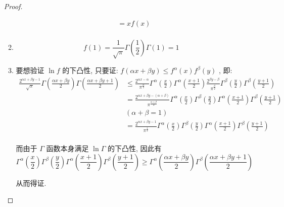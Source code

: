 \documentclass{article}
\begin{document}
\begin{enumerate}
\begin{proof}
\begin{enumerate}
\begin{equation}
\begin{aligned}
                    &=xf(x) \\
                \end{aligned}
                \nonumber
            \end{equation}
            \item \begin{equation}
                f(1)=\frac{1}{\sqrt{\pi}}\Gamma\left(\frac{1}{2}\right)\Gamma(1)=1
                \nonumber
            \end{equation}
            \item 要想验证 $\ln f$ 的下凸性, 只要证: $f(\alpha x+\beta y)\leq f^{\alpha}(x)f^{\beta}(y)$ , 即:
            \begin{equation}
                \begin{aligned}
                    \frac{2^{\alpha x+\beta y-1}}{\sqrt{\pi}}\Gamma\left(\frac{\alpha x+\beta y}{2}\right)\Gamma\left(\frac{\alpha x+\beta y+1}{2}\right)
                    &\leq\frac{2^{\alpha x-\alpha}}{\pi^{\frac{\alpha}{2}}}\Gamma^{\alpha}\left(\frac{x}{2}\right)\Gamma^{\alpha}\left(\frac{x+1}{2}\right)\frac{2^{\beta y-\beta}}{\pi^{\frac{\beta}{2}}}\Gamma^{\beta}\left(\frac{y}{2}\right)\Gamma^{\beta}\left(\frac{y+1}{2}\right) \\
                    &=\frac{2^{\alpha x+\beta y-(\alpha+\beta)}}{\pi^{\frac{\alpha+\beta}{2}}}\Gamma^{\alpha}\left(\frac{x}{2}\right)\Gamma^{\beta}\left(\frac{y}{2}\right)\Gamma^{\alpha}\left(\frac{x+1}{2}\right)\Gamma^{\beta}\left(\frac{y+1}{2}\right) \\
                    &(\alpha+\beta=1) \\
                    &=\frac{2^{\alpha x+\beta y-1}}{\pi^{\frac{1}{2}}}\Gamma^{\alpha}\left(\frac{x}{2}\right)\Gamma^{\beta}\left(\frac{y}{2}\right)\Gamma^{\alpha}\left(\frac{x+1}{2}\right)\Gamma^{\beta}\left(\frac{y+1}{2}\right) \\
                \end{aligned}
                \nonumber
            \end{equation} \par
            而由于 $\Gamma$ 函数本身满足 $\ln\Gamma$ 的下凸性, 因此有 $$\Gamma^{\alpha}\left(\frac{x}{2}\right)\Gamma^{\beta}\left(\frac{y}{2}\right)\Gamma^{\alpha}\left(\frac{x+1}{2}\right)\Gamma^{\beta}\left(\frac{y+1}{2}\right)\geq\Gamma^{\alpha}\left(\frac{\alpha x+\beta y}{2}\right)\Gamma^{\beta}\left(\frac{\alpha x+\beta y+1}{2}\right)$$ \par
            从而得证.
        \end{enumerate}

\end{proof}
\end{enumerate}
\end{document}
